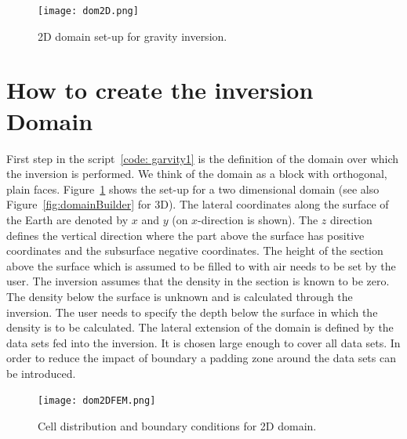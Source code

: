 \begin{figure}
\centering
\texttt{[image: dom2D.png]}
\caption{2D domain set-up for gravity inversion.}
\label{FIG:P1:GRAV:2}
\end{figure}

\section{How to create the inversion Domain}
First step in the script~\ref{code: garvity1} is the definition of the domain over which the inversion is performed.
We think of the domain as a block with orthogonal, plain faces. Figure~\ref{FIG:P1:GRAV:2} shows the set-up for 
a two dimensional domain (see also Figure~\ref{fig:domainBuilder} for 3D). The lateral coordinates along the 
surface of the Earth are denoted by $x$ and $y$ (on $x$-direction is shown). The $z$ direction defines the
vertical direction where the part above the surface has positive coordinates and the 
subsurface negative coordinates. The height of the section above the surface which is assumed to be filled to with air 
needs to be set by the user. The inversion assumes that the density in the section is known to be zero. The density
below the surface is unknown and is calculated through the inversion. The user needs to specify the depth below
the surface in which the density is to be calculated. 
The lateral extension of the domain is defined by the data sets fed into the inversion. It is chosen large enough
to cover all data sets. In order to reduce the impact of boundary a padding zone around the data sets can be introduced.
  
\begin{figure}
\centering
\texttt{[image: dom2DFEM.png]}
\caption{Cell distribution and boundary conditions for 2D domain.}
\label{FIG:P1:GRAV:3}
\end{figure}

